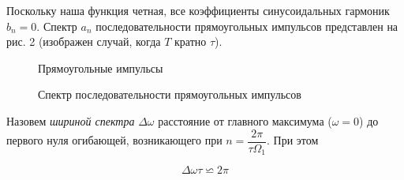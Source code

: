 \documentclass[a4paper, 14pt]{extarticle}%
\begin{document}
	Поскольку наша функция четная, все коэффициенты синусоидальных гармоник $b_{n}=0$. Спектр $a_{n}$ последовательности прямоугольных импульсов представлен на рис. 2 (изображен случай, когда $T$ кратно $\tau$).
		
		
		\begin{figure}[h]
			\begin{minipage}[h]{0.5\linewidth}
				\caption{Прямоугольные импульсы}
			\end{minipage}
			\begin{minipage}[h]{0.5\linewidth}
				\caption{Спектр последовательности прямоугольных импульсов}
			\end{minipage}
		\end{figure}
	
	Назовем \textit{шириной спектра} $\Delta \omega$ расстояние от главного максимума ($\omega =0$) до первого нуля огибающей, возникающего при $n=\dfrac{2\pi}{\tau \Omega_{1}}$. При этом 

	$$\Delta \omega \tau \backsimeq 2 \pi $$
	
\end{document}
